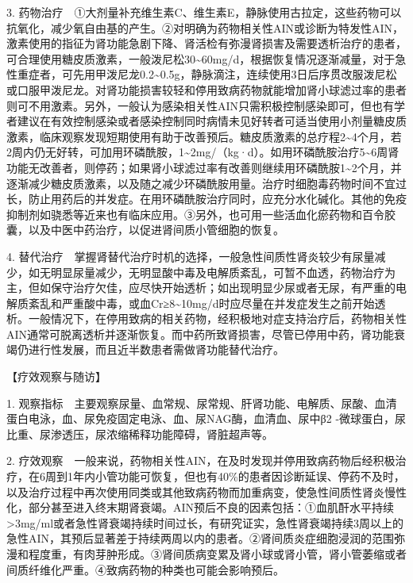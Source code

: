 3.
药物治疗　①大剂量补充维生素C、维生素E，静脉使用古拉定，这些药物可以抗氧化，减少氧自由基的产生。②对明确为药物相关性AIN或诊断为特发性AIN，激素使用的指征为肾功能急剧下降、肾活检有弥漫肾损害及需要透析治疗的患者，可合理使用糖皮质激素，一般泼尼松30\textasciitilde{}60mg/d，根据恢复情况逐渐减量，对于急性重症者，可先用甲泼尼龙0.2\textasciitilde{}0.5g，静脉滴注，连续使用3日后序贯改服泼尼松或口服甲泼尼龙。对肾功能损害较轻和停用致病药物就能增加肾小球滤过率的患者则可不用激素。另外，一般认为感染相关性AIN只需积极控制感染即可，但也有学者建议在有效控制感染或者感染控制同时病情未见好转者可适当使用小剂量糖皮质激素，临床观察发现短期使用有助于改善预后。糖皮质激素的总疗程2\textasciitilde{}4个月，若2周内仍无好转，可加用环磷酰胺，1\textasciitilde{}2mg/（kg·d）。如用环磷酰胺治疗5\textasciitilde{}6周肾功能无改善者，则停药；如果肾小球滤过率有改善则继续用环磷酰胺1\textasciitilde{}2个月，并逐渐减少糖皮质激素，以及随之减少环磷酰胺用量。治疗时细胞毒药物时间不宜过长，防止用药后的并发症。在用环磷酰胺治疗同时，应充分水化碱化。其他的免疫抑制剂如骁悉等近来也有临床应用。③另外，也可用一些活血化瘀药物和百令胶囊，以及中医中药治疗，以促进肾间质小管细胞的恢复。

4.
替代治疗　掌握肾替代治疗时机的选择，一般急性间质性肾炎较少有尿量减少，如无明显尿量减少，无明显酸中毒及电解质紊乱，可暂不血透，药物治疗为主，但如保守治疗欠佳，应尽快开始透析；如出现明显少尿或者无尿，有严重的电解质紊乱和严重酸中毒，或血Cr≥8\textasciitilde{}10mg/d时应尽量在并发症发生之前开始透析。一般情况下，在停用致病的相关药物，经积极地对症支持治疗后，药物相关性AIN通常可脱离透析并逐渐恢复。而中药所致肾损害，尽管已停用中药，肾功能衰竭仍进行性发展，而且近半数患者需做肾功能替代治疗。

【疗效观察与随访】

1.
观察指标　主要观察尿量、血常规、尿常规、肝肾功能、电解质、尿酸、血清蛋白电泳，血、尿免疫固定电泳、血、尿NAG酶，血清血、尿中β{2}
-微球蛋白，尿比重、尿渗透压，尿浓缩稀释功能障碍，肾脏超声等。

2.
疗效观察　一般来说，药物相关性AIN，在及时发现并停用致病药物后经积极治疗，在6周到1年内小管功能可恢复，但也有40\%的患者因诊断延误、停药不及时，以及治疗过程中再次使用同类或其他致病药物而加重病变，使急性间质性肾炎慢性化，部分甚至进入终末期肾衰竭。AIN预后不良的因素包括：①血肌酐水平持续\textgreater{}3mg/ml或者急性肾衰竭持续时间过长，有研究证实，急性肾衰竭持续3周以上的急性AIN，其预后显著差于持续两周以内的患者。②肾间质炎症细胞浸润的范围弥漫和程度重，有肉芽肿形成。③肾间质病变累及肾小球或肾小管，肾小管萎缩或者间质纤维化严重。④致病药物的种类也可能会影响预后。

